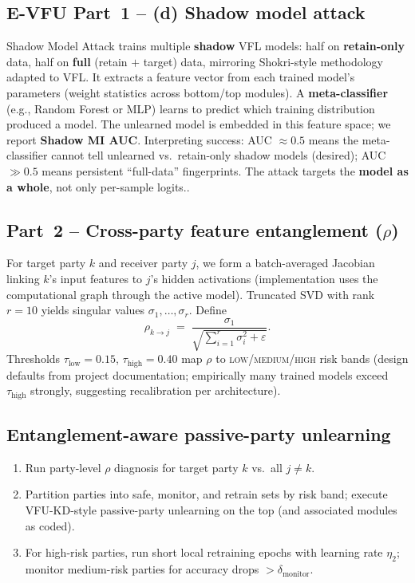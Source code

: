 \documentclass[sigconf,nonacm]{acmart}
\begin{document}
\subsection{E-VFU Part~1 -- (d) Shadow model attack}
Shadow Model Attack trains multiple \textbf{shadow} VFL models: half on \textbf{retain-only} data, half on \textbf{full} (retain $+$ target) data, mirroring Shokri-style methodology adapted to VFL. It extracts a feature vector from each trained model's parameters (weight statistics across bottom/top modules). A \textbf{meta-classifier} (e.g., Random Forest or MLP) learns to predict which training distribution produced a model. The unlearned model is embedded in this feature space; we report \textbf{Shadow MI AUC}. Interpreting success: AUC $\approx 0.5$ means the meta-classifier cannot tell unlearned vs.\ retain-only shadow models (desired); AUC $\gg 0.5$ means persistent ``full-data'' fingerprints. The attack targets the \textbf{model as a whole}, not only per-sample logits..

\subsection{Part~2 -- Cross-party feature entanglement ($\rho$)}
For target party $k$ and receiver party $j$, we form a batch-averaged Jacobian linking $k$'s input features to $j$'s hidden activations (implementation uses the computational graph through the active model). Truncated SVD with rank $r{=}10$ yields singular values $\sigma_1,\ldots,\sigma_r$. Define
\begin{equation}
  \rho_{k\to j} \;=\; \frac{\sigma_1}{\sqrt{\sum_{i=1}^{r}\sigma_i^2 + \varepsilon}}.
\end{equation}
Thresholds $\tau_{\mathrm{low}}{=}0.15$, $\tau_{\mathrm{high}}{=}0.40$ map $\rho$ to \textsc{low/medium/high} risk bands (design defaults from project documentation; empirically many trained models exceed $\tau_{\mathrm{high}}$ strongly, suggesting recalibration per architecture).

\subsection{Entanglement-aware passive-party unlearning}
\begin{enumerate}[leftmargin=*]
  \item Run party-level $\rho$ diagnosis for target party $k$ vs.\ all $j\neq k$.
  \item Partition parties into safe, monitor, and retrain sets by risk band; execute VFU-KD-style passive-party unlearning on the top (and associated modules as coded).
  \item For high-risk parties, run short local retraining epochs with learning rate $\eta_2$; monitor medium-risk parties for accuracy drops $>\delta_{\mathrm{monitor}}$.
\end{enumerate}
\end{document}
